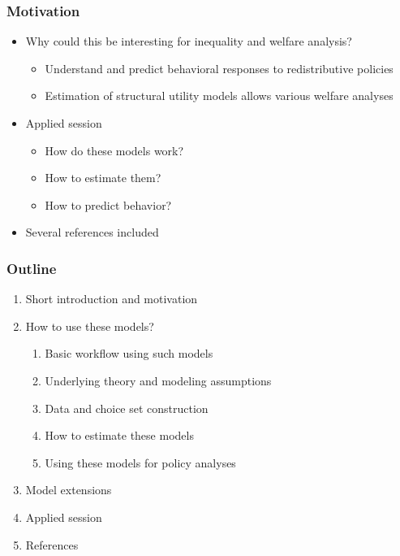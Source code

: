 \documentclass[handout,intlimits]{beamer}
\def\litc#1{\textcolor{med-gray}{\tiny\citep{#1}}}
\def\litf#1{\textcolor{med-gray}{\tiny\citep*{#1}}}
\def\blue#1{\textcolor{zewblue}{#1}}
\begin{document}
\begin{frame}
\frametitle{Motivation}
\begin{itemize}
	\item \blue{Why could this be interesting for inequality and welfare analysis?}
	\begin{itemize}
		\item Understand and predict behavioral responses to redistributive policies
		\smallskip
		\item Estimation of structural utility models allows various welfare analyses \litf{bargain_etal_2013, bargain_etal_itax_2014, bargain_etal_annes_2014}
	\end{itemize}
	\bigskip
	\item \blue{Applied session}
	\begin{itemize}
		\item How do these models work?
		\smallskip
		\item How to estimate them?
		\smallskip
		\item How to predict behavior?
	\end{itemize}
	\bigskip
	\item \blue{Several references included} \litc{creedy_kalb_2005, creedy_kalb_2006, aaberge_colombino_2014}
\end{itemize}
\end{frame}

\begin{frame}
\frametitle{Outline}
\begin{enumerate}
	\item Short introduction and motivation
	\bigskip
	\item How to use these models?
	\begin{enumerate}
		\item Basic workflow using such models
		\smallskip
		\item Underlying theory and modeling assumptions
		\smallskip
		\item Data and choice set construction
		\smallskip
		\item How to estimate these models
		\smallskip
		\item Using these models for policy analyses
	\end{enumerate}
	\bigskip
	\item Model extensions
	\bigskip
	\item Applied session
	\bigskip
	\item References
\end{enumerate}
\end{frame}
\end{document}
